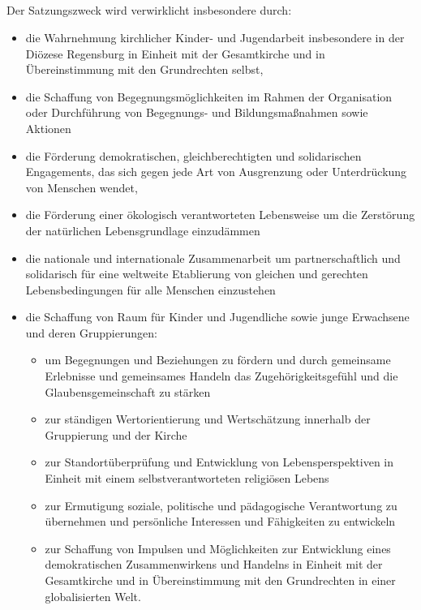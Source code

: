 \documentclass[12pt]{report}
\begin{document}
\begin{flushleft}
\subsection{}
Der Satzungszweck wird verwirklicht insbesondere durch:
\begin{itemize}
  \item die Wahrnehmung kirchlicher Kinder- und Jugendarbeit insbesondere in der Diözese Regensburg
        in Einheit mit der Gesamtkirche und in Übereinstimmung mit den Grundrechten selbst,
  \item die Schaffung von Begegnungsmöglichkeiten im Rahmen der Organisation oder Durchführung von
        Begegnungs- und Bildungsmaßnahmen sowie Aktionen
  \item die Förderung demokratischen, gleichberechtigten und solidarischen Engagements, das sich
        gegen jede Art von Ausgrenzung oder Unterdrückung von Menschen wendet,
  \item die Förderung einer ökologisch verantworteten Lebensweise um die Zerstörung der
          natürlichen Lebensgrundlage einzudämmen
  \item die nationale und internationale Zusammenarbeit um partnerschaftlich und solidarisch für
        eine weltweite Etablierung von gleichen und gerechten Lebensbedingungen für alle Menschen einzustehen
  \item die Schaffung von Raum für Kinder und Jugendliche sowie junge Erwachsene und deren
        Gruppierungen:
    \begin{itemize}
      \item um Begegnungen und Beziehungen zu fördern und durch gemeinsame Erlebnisse und gemeinsames Handeln
            das Zugehörigkeitsgefühl und die Glaubensgemeinschaft zu stärken
      \item zur ständigen Wertorientierung und Wertschätzung innerhalb der Gruppierung und der Kirche
      \item zur Standortüberprüfung und Entwicklung von Lebensperspektiven in Einheit mit einem 
            selbstverantworteten religiösen Lebens
      \item zur Ermutigung soziale, politische und pädagogische Verantwortung zu übernehmen und  
            persönliche Interessen und Fähigkeiten zu entwickeln
      \item zur Schaffung von Impulsen und Möglichkeiten zur Entwicklung eines demokratischen Zusammenwirkens
            und Handelns in Einheit mit der Gesamtkirche und in Übereinstimmung 
            mit den Grundrechten in einer globalisierten Welt.
    \end{itemize}
\end{itemize}

\end{flushleft}
\end{document}
